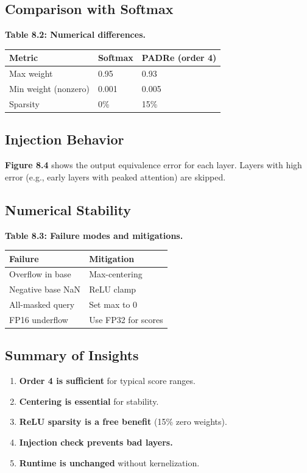 \subsection{Comparison with Softmax}

\textbf{Table 8.2: Numerical differences.}

\begin{table}[H]
\centering
\small
\begin{tabular}{lll}
\toprule
\textbf{Metric} & \textbf{Softmax} & \textbf{PADRe (order 4)} \\
\midrule
Max weight & 0.95 & 0.93 \\
Min weight (nonzero) & 0.001 & 0.005 \\
Sparsity & 0\% & 15\% \\
\bottomrule
\end{tabular}
\end{table}

\subsection{Injection Behavior}

\textbf{Figure 8.4} shows the output equivalence error for each layer. Layers 
with high error (e.g., early layers with peaked attention) are skipped.

\subsection{Numerical Stability}

\textbf{Table 8.3: Failure modes and mitigations.}

\begin{table}[H]
\centering
\small
\begin{tabular}{ll}
\toprule
\textbf{Failure} & \textbf{Mitigation} \\
\midrule
Overflow in base & Max-centering \\
Negative base NaN & ReLU clamp \\
All-masked query & Set max to 0 \\
FP16 underflow & Use FP32 for scores \\
\bottomrule
\end{tabular}
\end{table}

\subsection{Summary of Insights}

\begin{enumerate}
\item \textbf{Order 4 is sufficient} for typical score ranges.
\item \textbf{Centering is essential} for stability.
\item \textbf{ReLU sparsity is a free benefit} (15\% zero weights).
\item \textbf{Injection check prevents bad layers.}
\item \textbf{Runtime is unchanged} without kernelization.

\end{enumerate}

